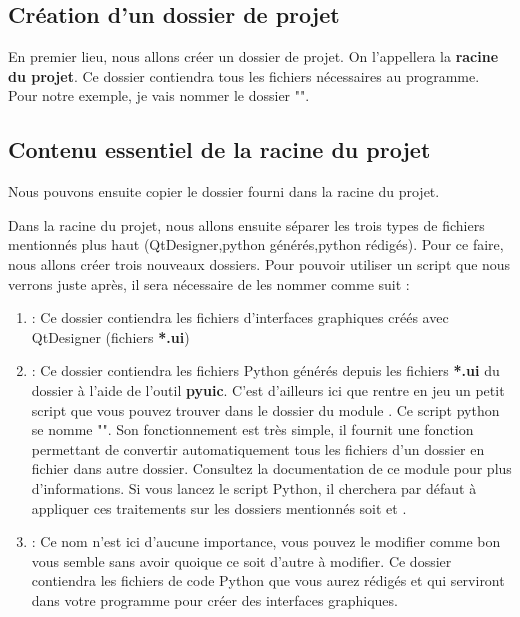 \subsection{Création d'un dossier de projet}

En premier lieu, nous allons créer un dossier de projet. On l'appellera la \textbf{racine du projet}. Ce dossier contiendra tous les fichiers nécessaires au programme.\newline
Pour notre exemple, je vais nommer le dossier "".\newline

\subsection{Contenu essentiel de la racine du projet}

Nous pouvons ensuite copier le dossier  fourni dans la racine du projet.\newline

Dans la racine du projet, nous allons ensuite séparer les trois types de fichiers mentionnés plus haut (QtDesigner,python générés,python rédigés). Pour ce faire, nous allons créer  trois nouveaux dossiers. Pour pouvoir utiliser un script que nous verrons juste après, il sera nécessaire de les nommer comme suit :
\begin{enumerate}

\item {} : Ce dossier contiendra les fichiers d'interfaces graphiques créés avec QtDesigner (fichiers \textbf{*.ui})\newline

\item {} : Ce dossier contiendra les fichiers Python générés depuis les fichiers \textbf{*.ui} du dossier  à l'aide de l'outil \textbf{pyuic}.\newline
C'est d'ailleurs ici que rentre en jeu un petit script que vous pouvez trouver dans le dossier du module . Ce script python se nomme "". Son fonctionnement est très simple, il fournit une fonction permettant de convertir automatiquement tous les fichiers  d'un dossier en fichier  dans autre dossier. Consultez la documentation de ce module pour plus d'informations.\newline
Si vous lancez le script Python, il cherchera par défaut à appliquer ces traitements sur les dossiers mentionnés soit  et .

\item {} : Ce nom n'est ici d'aucune importance, vous pouvez le modifier comme bon vous semble sans avoir quoique ce soit d'autre à modifier.\newline
Ce dossier contiendra les fichiers de code Python que vous aurez rédigés et qui serviront dans votre programme pour créer des interfaces graphiques.

\end{enumerate}

